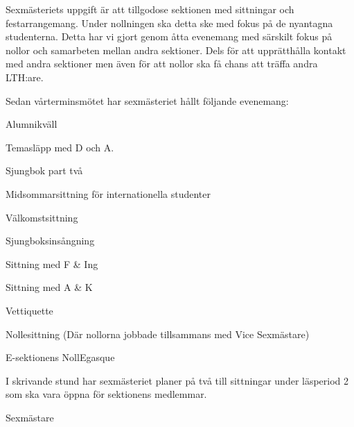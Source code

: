 \documentclass[../_main/handlingar.tex]{subfiles}
\begin{document}
\vspace{8px}

Sexmästeriets uppgift är att tillgodose sektionen med sittningar och festarrangemang. Under nollningen ska detta ske med fokus på de nyantagna studenterna. Detta har vi gjort genom åtta evenemang med särskilt fokus på nollor och samarbeten mellan andra sektioner. Dels för att upprätthålla kontakt med andra sektioner men även för att nollor ska få chans att träffa andra LTH:are.

Sedan vårterminsmötet har sexmästeriet hållt följande evenemang:


\begin{dashlist}
    \item Alumnikväll
    \item Temasläpp med D och A.
    \item Sjungbok part två
    \item Midsommarsittning för internationella studenter
    \item Välkomstsittning
    \item Sjungboksinsångning
    \item Sittning med F \& Ing
    \item Sittning med A \& K
    \item Vettiquette
    \item Nollesittning (Där nollorna jobbade tillsammans med Vice Sexmästare)
    \item E-sektionens NollEgasque
\end{dashlist}


I skrivande stund har sexmästeriet planer på två till sittningar under läsperiod 2 som ska vara öppna för sektionens medlemmar.



\begin{signatures}{1}
    \mvh
    \signature{Theo Nyman}{Sexmästare}
\end{signatures}
\end{document}
